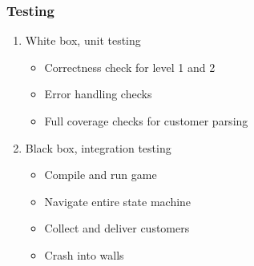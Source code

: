 \begin{frame}
    \frametitle{Testing}
    \begin{enumerate}
        \item White box, unit testing
        \begin{itemize}
          \item Correctness check for level 1 and 2
          \item Error handling checks
          \item Full coverage checks for customer parsing
        \end{itemize}
        \item Black box, integration testing
        \begin{itemize}
          \item Compile and run game
          \item Navigate entire state machine
          \item Collect and deliver customers
          \item Crash into walls
        \end{itemize}
    \end{enumerate}
\end{frame}
